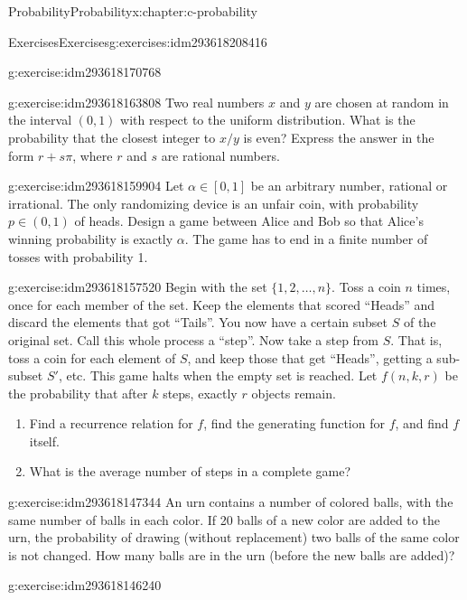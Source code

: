 \documentclass[twoside,10pt,]{book}
\numberwithin{equation}{section}
\begin{document}
\begin{chapterptx}{Probability}{}{Probability}{}{}{x:chapter:c-probability}
\begin{exercises-section}{Exercises}{}{Exercises}{}{}{g:exercises:idm293618208416}
\begin{divisionexercise}{8}{}{}{g:exercise:idm293618170768}
\end{divisionexercise}%
\begin{divisionexercise}{9}{}{}{g:exercise:idm293618163808}%
Two real numbers \(x\) and \(y\) are chosen at random in the interval \((0,1)\) with respect to the uniform distribution. What is the probability that the closest integer to \(x/y\) is even? Express the answer in the form \(r + s \pi\), where \(r\) and \(s\) are rational numbers.%
\end{divisionexercise}%
\begin{divisionexercise}{10}{}{}{g:exercise:idm293618159904}%
Let \(\alpha  \in  [0,1]\) be an arbitrary number, rational or irrational. The only randomizing device is an unfair coin, with probability \(p \in (0,1)\) of heads. Design a game between Alice and Bob so that Alice's winning probability is exactly \(\alpha\). The game has to end in a finite number of tosses with probability 1.%
\end{divisionexercise}%
\begin{divisionexercise}{11}{}{}{g:exercise:idm293618157520}%
Begin with the set \(\{1,2,\dots,n\}\). Toss a coin \(n\) times, once for each member of the set. Keep the elements that scored ``Heads'' and discard the elements that got ``Tails''. You now have a certain subset \(S\) of the original set. Call this whole process a ``step''. Now take a step from \(S\). That is, toss a coin for each element of \(S\), and keep those that get ``Heads'', getting a sub-subset \(S'\), etc. This game halts when the empty set is reached. Let \(f(n,k,r)\) be the probability that after \(k\) steps, exactly \(r\) objects remain.%
\begin{enumerate}[label=(\alph*)]
\item{}Find a recurrence relation for \(f\), find the generating function for \(f\), and find \(f\) itself.%
\item{}What is the average number of steps in a complete game?%
\end{enumerate}
%
\end{divisionexercise}%
\begin{divisionexercise}{12}{}{}{g:exercise:idm293618147344}%
An urn contains a number of colored balls, with the same number of balls in each color. If 20 balls of a new color are added to the urn, the probability of drawing (without replacement) two balls of the same color is not changed. How many balls are in the urn (before the new balls are added)?%
\end{divisionexercise}%
\begin{divisionexercise}{13}{}{}{g:exercise:idm293618146240}%

\end{divisionexercise}
\end{exercises-section}
\end{chapterptx}
\end{document}
